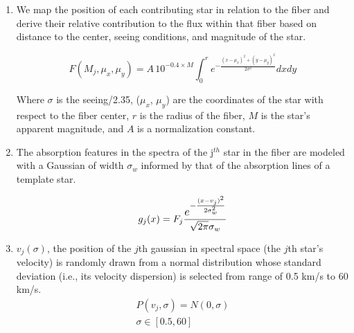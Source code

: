 \documentclass[%
 aip,
 twocolumn,
 jmp,%
 amsmath,amssymb,
 reprint,%
]{aastex61}
\begin{document}
\begin{enumerate}
	\item We map the position of each contributing star 
	in relation to the fiber and derive their relative contribution 
	to the flux within that fiber based on distance to the center, seeing 
	conditions, and magnitude of the star. 
	
	\begin{equation}
	F(M_j,\mu_x,\mu_y) = A \,10^{-0.4 \times M}\int_{0}^{r} 
	e^{-\frac{(x-\mu_x)^2+(y-\mu_y)^2}{2\sigma^2}}dxdy
	\end{equation}
	
	Where $\sigma$ is the seeing/2.35, ($\mu_x$, $\mu_y$) are 
	the coordinates of the star with respect to the fiber center,
	$r$ is the radius of the fiber, $M$ is the star's apparent magnitude,
	and $A$ is a normalization constant.
	
	\item The absorption features in the spectra of the j$^{th}$ star 
	in the fiber are modeled with a Gaussian of width $\sigma_w$ 
	informed by that of the absorption lines of a template star. 
	
	\begin{equation}
	g_j(x) =  F_j \frac{\mathlarger{
	                    \mathlarger{e^{-\frac{(x-v_j)^2}
	                                         {2 \sigma_w ^2}
	                                  }
	                               }
	                    }}
	                   {\sqrt{2\pi}\sigma_w}
	\end{equation}
	
	\item $v_j(\sigma)$, the position of the $j$th gaussian in spectral space (the $j$th star's velocity) is randomly drawn from a normal distribution whose standard deviation (i.e., its velocity dispersion) is selected from range of 0.5 km/s to 60 km/s.
	\begin{align*}
	P(v_j,\sigma) = N(0,\sigma) \\
	\sigma \in [0.5,60]
	\end{align*}
	

\end{enumerate}
\end{document}
